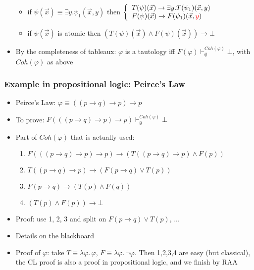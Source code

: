 \documentclass[handout,11pt]{beamer}
\newcommand{\red}[1]{\textcolor{red}{#1}}
\newcommand{\imp}{\rightarrow}
\begin{document}
\begin{frame}
\begin{itemize}[<+->]
\begin{itemize}
\item

 if $\psi(\vec{x})\equiv\exists y.\psi_1(\vec{x},y)$ then 
$\left\{\begin{array}{ll}
T(\psi)(\vec{x})\to \exists y.T(\psi_1)(\vec{x},y)\\
F(\psi)(\vec{x})\to F(\psi_1)(\vec{x},\red{y})
\end{array}\right.$

\item
 if $\psi(\vec{x})$ is atomic then 
 $(T(\psi)(\vec{x})\wedge F(\psi)(\vec{x})) \to \bot$
 \end{itemize} 
 \item By the completeness of tableaux: $\varphi$ is a tautology iff
 $F(\varphi)\vdash^{Coh(\varphi)}_\emptyset \bot$, 
 with $Coh(\varphi)$ as above
 \end{itemize} 
\end{frame}

\begin{frame}
\frametitle{Example in propositional logic: Peirce's Law}
 \begin{itemize}[<+->] 
    \item Peirce's Law: $\varphi\equiv((p\imp q)\imp p)\imp p$
    \item To prove: $F(((p\imp q)\imp p)\imp p) 
    \vdash^{Coh(\varphi)}_\emptyset\bot$    
    \item Part of $Coh(\varphi)$ that is actually used:
    \begin{enumerate}[<+->]
    	\item $F(((p\imp q)\imp p)\imp p) \imp (T((p\imp q)\imp p) \wedge F(p))$
    	\item $T((p\imp q)\imp p) \imp (F(p\imp q) \vee T(p))$
    	\item $F(p\imp q) \imp (T(p) \wedge F(q))$
    	\item $(T(p) \wedge F(p)) \imp \bot$
    \end{enumerate}
    \item Proof: use 1, 2, 3 and split on $F(p\imp q) \vee T(p)$, ...
    \item Details on the blackboard
    \item Proof of $\varphi$: take $T\equiv\lambda\varphi.\,\varphi$,
     $F\equiv\lambda\varphi.\,\neg\varphi$. Then 1,2,3,4 are easy
     (but classical), the CL proof is also a proof 
     in propositional logic, and we finish by RAA
 \end{itemize}
\end{frame}
\end{document}
